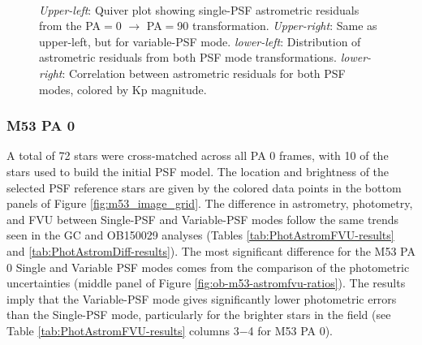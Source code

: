 \documentclass[]{spie}  %
\begin{document}
\begin{figure}[!h]
  \centering
  \\
  \hspace{-1cm}
  \caption{\textit{Upper-left}: Quiver plot showing single-PSF astrometric residuals from the PA$=$0 $\rightarrow$ PA$=$90 transformation. \textit{Upper-right}: Same as upper-left, but for variable-PSF mode. \textit{lower-left}: Distribution of astrometric residuals from both PSF mode transformations. \textit{lower-right}: Correlation between astrometric residuals for both PSF modes, colored by Kp magnitude.} \label{fig:m53_PA_compare}
\end{figure}

\subsubsection{M53 PA 0} \label{sec:result-m53-pa0}
A total of 72 stars were cross-matched across all PA 0 frames, with 10 of the stars used to build the initial PSF model. The location and brightness of the selected PSF reference stars are given by the colored data points in the bottom panels of Figure \ref{fig:m53_image_grid}. The difference in astrometry, photometry, and FVU between Single-PSF and Variable-PSF modes follow the same trends seen in the GC and OB150029 analyses (Tables \ref{tab:PhotAstromFVU-results} and \ref{tab:PhotAstromDiff-results}). The most significant difference for the M53 PA 0 Single and Variable PSF modes comes from the comparison of the photometric uncertainties (middle panel of Figure \ref{fig:ob-m53-astromfvu-ratios}). The results imply that the Variable-PSF mode gives significantly lower photometric errors than the Single-PSF mode, particularly for the brighter stars in the field (see Table \ref{tab:PhotAstromFVU-results} columns 3$-$4 for M53 PA 0).
\end{document}
